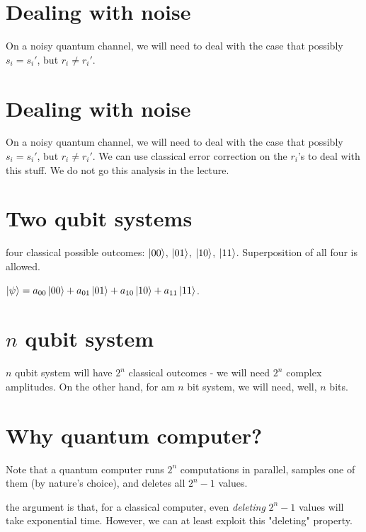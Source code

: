 \section{Dealing with noise}

On a noisy quantum channel, we will need to deal with the case that possibly
$s_i = s_i'$, but $r_i \neq r_i'$.


\section{Dealing with noise}

On a noisy quantum channel, we will need to deal with the case that possibly
$s_i = s_i'$, but $r_i \neq r_i'$. We can use classical error correction on
the $r_i$'s to deal with this stuff. We do not go this analysis in the lecture.


\section{Two qubit systems}

four classical possible outcomes: $\ket{00}$, $\ket{01}$, $\ket{10}$, $\ket{11}$.
Superposition of all four is allowed.

$\ket{\psi} = a_{00} \ket{00} + a_{01} \ket{01} + a_{10} \ket{10} + a_{11} \ket{11}$.

\section{$n$ qubit system}
$n$ qubit system will have $2^n$ classical outcomes - we will need $2^n$ complex amplitudes.
On the other hand, for am $n$ bit system, we will need, well, $n$ bits.

\section{Why quantum computer?}

Note that a quantum computer runs $2^n$ computations in parallel, samples one of
them (by nature's choice), and deletes all $2^n - 1$ values.

the argument is that, for a classical computer, even \textit{deleting}
$2^n - 1$ values will take exponential time. However, we can at least
exploit this "deleting" property.



